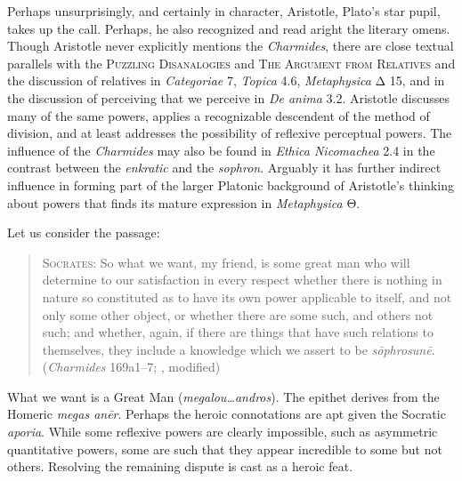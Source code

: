 Perhaps unsurprisingly, and certainly in character, Aristotle, Plato's star pupil, takes up the call. Perhaps, he also recognized and read aright the literary omens. Though Aristotle never explicitly mentions the \emph{Charmides}, there are close textual parallels with the \textsc{Puzzling Disanalogies} and \textsc{The Argument from Relatives} and the discussion of relatives in \emph{Categoriae} 7, \emph{Topica} 4.6, \emph{Metaphysica} {\sbl Δ} 15, and in the discussion of perceiving that we perceive in \emph{De anima} 3.2. Aristotle discusses many of the same powers, applies a recognizable descendent of the method of division, and at least addresses the possibility of reflexive perceptual powers. The influence of the \emph{Charmides} may also be found in \emph{Ethica Nicomachea} 2.4 in the contrast between the \emph{enkratic} and the \emph{sophron}. Arguably it has further indirect influence in forming part of the larger Platonic background of Aristotle's thinking about powers that finds its mature expression in \emph{Metaphysica} {\sbl Θ}.

Let us consider the passage:
\begin{quote}
	\textsc{Socrates}: So what we want, my friend, is some great man who will determine to our satisfaction in every respect whether there is nothing in nature so constituted as to have its own power applicable to itself, and not only some other object, or whether there are some such, and others not such; and whether, again, if there are things that have such relations to themselves, they include a knowledge which we assert to be \emph{sōphrosunē}. (\emph{Charmides} 169a1–7; \citealt[63–5]{Lamb:1927qw}, modified)
\end{quote}
What we want is a Great Man (\emph{megalou\ldots andros}). The epithet derives from the Homeric \emph{megas anēr}. Perhaps the  heroic connotations are apt given the Socratic \emph{aporia}. While some reflexive powers are clearly impossible, such as asymmetric quantitative powers, some are such that they appear incredible to some but not others. Resolving the remaining dispute is cast as a heroic feat. 

